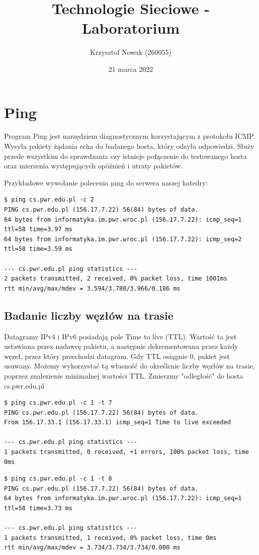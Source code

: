 \documentclass{article}
\title{Technologie Sieciowe - Laboratorium}
\date{21 marca 2022}
\author{Krzysztof Nowak (260055)}
\begin{document}
    \maketitle

    \section{Ping}
    Program Ping jest narzędziem diagnostycznym korzystającym z protokołu ICMP. Wysyła pakiety żądania echa do badanego hosta, który odsyła odpowiedzi. Służy przede wszystkim do sprawdzania czy istnieje połączenie do testowanego hosta oraz mierzenia występujących opóźnień i utraty pakietów.

Przykładowe wywołanie polecenia ping do serwera naszej katedry:
    \begin{lstlisting}
$ ping cs.pwr.edu.pl -c 2
PING cs.pwr.edu.pl (156.17.7.22) 56(84) bytes of data.
64 bytes from informatyka.im.pwr.wroc.pl (156.17.7.22): icmp_seq=1 ttl=58 time=3.97 ms
64 bytes from informatyka.im.pwr.wroc.pl (156.17.7.22): icmp_seq=2 ttl=58 time=3.59 ms

--- cs.pwr.edu.pl ping statistics ---
2 packets transmitted, 2 received, 0% packet loss, time 1001ms
rtt min/avg/max/mdev = 3.594/3.780/3.966/0.186 ms
    \end{lstlisting}

    \subsection{Badanie liczby węzłów na trasie}
    Datagramy IPv4 i IPv6 posiadają pole Time to live (TTL). Wartość ta jest ustawiana przez nadawcę pakietu, a następnie dekrementowana przez każdy węzeł, przez który przechodzi datagram. Gdy TTL osiągnie 0, pakiet jest usuwany. Możemy wykorzystać tą własność do określenie liczby węzłów na trasie, poprzez znalezienie minimalnej wartości TTL. Zmierzmy "odległość" do hosta cs.pwr.edu.pl
    
\begin{lstlisting}
$ ping cs.pwr.edu.pl -c 1 -t 7
PING cs.pwr.edu.pl (156.17.7.22) 56(84) bytes of data.
From 156.17.33.1 (156.17.33.1) icmp_seq=1 Time to live exceeded

--- cs.pwr.edu.pl ping statistics ---
1 packets transmitted, 0 received, +1 errors, 100% packet loss, time 0ms
\end{lstlisting}

    \begin{lstlisting}
$ ping cs.pwr.edu.pl -c 1 -t 8
PING cs.pwr.edu.pl (156.17.7.22) 56(84) bytes of data.
64 bytes from informatyka.im.pwr.wroc.pl (156.17.7.22): icmp_seq=1 ttl=58 time=3.73 ms

--- cs.pwr.edu.pl ping statistics ---
1 packets transmitted, 1 received, 0% packet loss, time 0ms
rtt min/avg/max/mdev = 3.734/3.734/3.734/0.000 ms
    \end{lstlisting}
\end{document}
